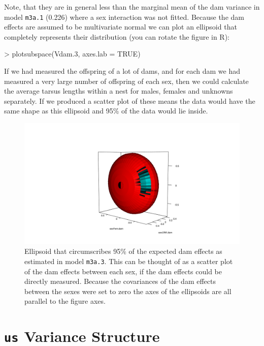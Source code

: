 \documentclass{article}
\begin{document}
Note, that they are in general less than the marginal mean of the dam variance in model \texttt{m3a.1} (0.226)  where a sex interaction was not fitted.  Because the dam effects are assumed to be multivariate normal we can plot an ellipsoid that completely represents their distribution (you can rotate the figure in R):

\begin{Schunk}
\begin{Sinput}
> plotsubspace(Vdam.3, axes.lab = TRUE)
\end{Sinput}
\end{Schunk}

If we had measured the offspring of a lot of dams, and for each dam we had measured a very large number of offspring of each sex, then we could calculate the average tarsus lengths within a nest for males, females and unknowns separately. If we produced a scatter plot of these means the data would have the same shape as this ellipsoid and 95\% of the data would lie inside.

\begin{figure}[!h]
\begin{center}
\includegraphics{rgl1.pdf}
\end{center}
\caption{Ellipsoid that circumscribes 95\% of the expected dam effects as estimated in model \texttt{m3a.3}. This can be thought of as a scatter plot of the dam effects between each sex, if the dam effects could be directly measured.  Because the covariances of the dam effects between the sexes were set to zero the axes of the ellipsoids are all parallel to the figure axes.}
\label{rgl1-fig}
\end{figure}

\section{\texttt{us} Variance Structure}
\end{document}
